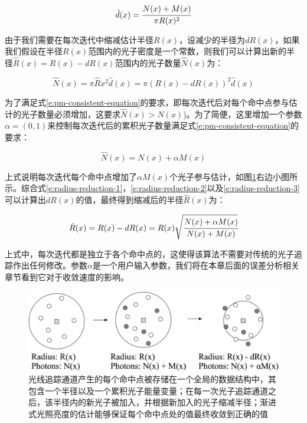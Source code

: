 \begin{equation}\label{e:radius-reduction-1}
	\hat{d}(x)= \cfrac{N(x)+M(x)}{\pi R(x)^{2}}
\end{equation}

\noindent 由于我们需要在每次迭代中缩减估计半径$R(x)$，设减少的半径为$dR(x)$，如果我们假设在半径$R(x)$范围内的光子密度是一个常数，则我们可以计算出新的半径$\hat{R}(x)=R(x)-dR(x)$范围内的光子数量$\hat{N}(x)$为：

\begin{equation}\label{e:radius-reduction-2}
	\hat{N}(x)=\pi\hat{R}{x}^{2}\hat{d}(x)=\pi (R(x)-dR(x))^{2}\hat{d}(x)
\end{equation}

\noindent 为了满足式\ref{e:pm-consistent-equation}的要求，即每次迭代后对每个命中点参与估计的光子数量必须增加，这要求$\hat{N}(x)>N(x)$)。为了简便，这里增加一个参数$\alpha = (0, 1)$来控制每次迭代后的累积光子数量满足式\ref{e:pm-consistent-equation}的要求：

\begin{equation}\label{e:radius-reduction-3}
	\hat{N}(x)=N(x)+\alpha M(x)
\end{equation}

\noindent 上式说明每次迭代每个命中点增加了$\alpha M(x)$个光子参与估计，如图\ref{f:pm-radius-reduction}右边小图所示。综合式\ref{e:radius-reduction-1}，\ref{e:radius-reduction-2}以及\ref{e:radius-reduction-3}可以计算出$dR(x)$的值，最终得到缩减后的半径$\hat{R}(x)$为：

\begin{equation}
	\hat{R}(x)=R(x)-dR(x)=R(x)\sqrt{ \cfrac{N(x)+\alpha M(x)}{N(x)+M(x)}}
\end{equation}

\noindent 上式中，每次迭代都是独立于各个命中点的，这使得该算法不需要对传统的光子追踪作出任何修改。参数$\alpha$是一个用户输入参数，我们将在本章后面的误差分析相关章节看到它对于收敛速度的影响。


\begin{figure}
	\begin{center}
		\includegraphics[width=\textwidth]{figures/pm/pm-19}
	\end{center}
	\caption{光线追踪通道产生的每个命中点被存储在一个全局的数据结构中，其包含一个半径以及一个累积光子能量变量；在每一次光子追踪通道之后，该半径内的新光子被加入，并根据新加入的光子缩减半径；渐进式光照亮度的估计能够保证每个命中点处的值最终收敛到正确的值}
	\label{f:pm-radius-reduction}
\end{figure}







